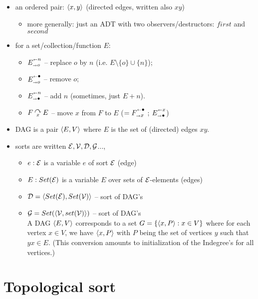 \documentclass[leqno]{article}
\newcommand{\srt}[1]{{\cal #1}}
\begin{document}
\begin{itemize}
\item an ordered pair: $\langle x,y\rangle$ (directed edges, written also $xy$)
 \begin{itemize}
 \item more generally: just an ADT with two observers/destructors: $first$ and $second$
 \end{itemize}
\item for a set/collection/function $E$: 
 \begin{itemize}
  \item  $\upd Eon$ -- replace $o$ by $n$ (i.e. $E\setminus\{o\}\cup\{n\}$);
  \item $\rem Eo$ -- remove $o$;
  \item $\add En$ -- add $n$ (sometimes, just $E+n$).
  \item $\mv FEx$ -- move $x$ from $F$ to $E$ ($=\rem Fx$ ; $\add Ex$)
 \end{itemize}
\item DAG is a pair $\langle E,V\rangle$ where $E$ is the set of (directed) edges $xy$.
\item sorts are written $\srt E,\srt V, \srt D, \srt G$..., 
 \begin{itemize}
 \item $e:\srt E$ is a variable $e$ of sort $\srt E$ (edge)
 \item $E:Set(\srt E)$ is a variable $E$ over sets of $\srt E$-elements (edges)
 \item $\srt D = \<Set(\srt E),Set(\srt V)\>$ -- sort of DAG's 
 \item $\srt G = Set(\<\srt V,set(\srt V)\>)$ -- sort of DAG's \\
 A DAG $\langle E,V\rangle$ corresponds to a set $G=\{\langle x,P\rangle:x\in V\}$ where for each 
vertex $x\in V$, we have $\langle x,P\rangle$ with 
$P$ being the set of vertices $y$ such that $yx\in E$.
(This conversion amounts to initialization of the Indegree's for all vertices.)
 \end{itemize}
\end{itemize}

\newpage
\section{Topological sort}
\end{document}

